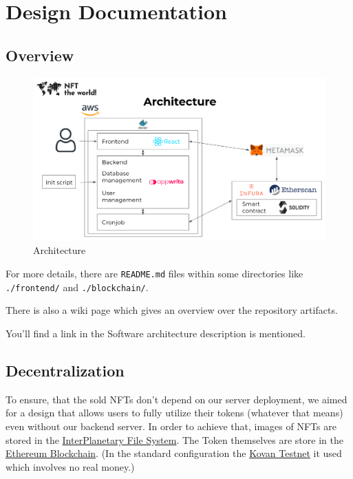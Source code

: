 \documentclass[
]{article}
\date{}
\begin{document}
\hypertarget{design-documentation}{%
\section{Design Documentation}\label{design-documentation}}

\hypertarget{overview}{%
\subsection{Overview}\label{overview}}

\begin{figure}
\centering
\includegraphics{images/architecture.png}
\caption{Architecture}
\end{figure}

For more details, there are \texttt{README.md} files within some
directories like \texttt{./frontend/} and \texttt{./blockchain/}.

There is also a wiki page which gives an overview over the repository
artifacts.

You'll find a link in the Software architecture description is
mentioned.

\hypertarget{decentralization}{%
\subsection{Decentralization}\label{decentralization}}

To ensure, that the sold NFTs don't depend on our server deployment, we
aimed for a design that allows users to fully utilize their tokens
(whatever that means) even without our backend server. In order to
achieve that, images of NFTs are stored in the
\href{https://en.wikipedia.org/wiki/InterPlanetary_File_System}{InterPlanetary
File System}. The Token themselves are store in the
\href{https://en.wikipedia.org/wiki/Ethereum}{Ethereum Blockchain}. (In
the standard configuration the
\href{https://eth.wiki/fundamentals/testnets}{Kovan Testnet} it used
which involves no real money.)
\end{document}
